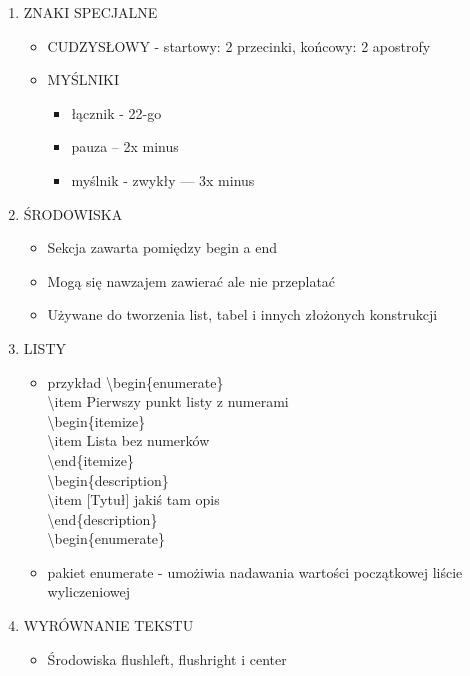 \documentclass[a4paper,twoside,onecolumn]{report}
\begin{document}
\begin{enumerate}
			\item ZNAKI SPECJALNE
			\begin{itemize}
				\item CUDZYSŁOWY - startowy: 2 przecinki, końcowy: 2 apostrofy
				\item MYŚLNIKI
				\begin{itemize}
					\item łącznik - 22-go
					\item pauza -- 2x minus
					\item myślnik - zwykły --- 3x minus
				\end{itemize}
			\end{itemize}

			\item ŚRODOWISKA
			\begin{itemize}
				\item Sekcja zawarta pomiędzy begin a end
				\item Mogą się nawzajem zawierać ale nie przeplatać
				\item Używane do tworzenia list, tabel i innych złożonych konstrukcji
			\end{itemize}

			\item LISTY \\
			\begin{itemize}
				\item przykład
					\textbackslash begin\{enumerate\} \\
					\textbackslash item Pierwszy punkt listy z numerami \\
					\textbackslash begin\{itemize\} \\
					\textbackslash item Lista bez numerków \\
					\textbackslash end\{itemize\} \\
					\textbackslash begin\{description\} \\
					\textbackslash item [Tytuł] jakiś tam opis \\ 
					\textbackslash end\{description\} \\
					\textbackslash begin\{enumerate\} \\
				\item pakiet enumerate - umożiwia nadawania wartości początkowej liście wyliczeniowej
			\end{itemize}

			\item WYRÓWNANIE TEKSTU
			\begin{itemize}
				\item Środowiska flushleft, flushright i center
			\end{itemize}



\end{enumerate}
\end{document}
